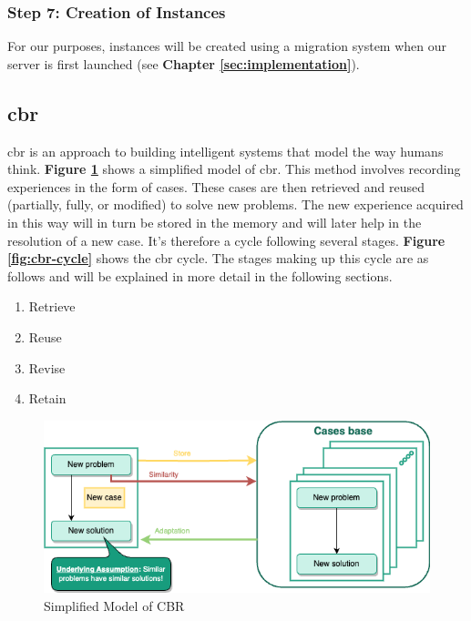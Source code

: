     
    \subsubsection{Step 7: Creation of Instances}
    For our purposes, instances will be created using a migration system when our server is first launched (see \textbf{Chapter \ref{sec:implementation}}).
    

\subsection{\acrlong{cbr} \label{subsec:cbr}}
\acrfull{cbr} is an approach to building intelligent systems that model the way humans think. \textbf{Figure \ref{fig:simple-cbr}} shows a simplified model of \acrshort{cbr}. This method involves recording experiences in the form of cases. These cases are then retrieved and reused (partially, fully, or modified) to solve new problems. The new experience acquired in this way will in turn be stored in the memory and will later help in the resolution of a new case. It's therefore a cycle following several stages. \textbf{Figure \ref{fig:cbr-cycle}} shows the \acrshort{cbr} cycle. The stages making up this cycle are as follows and will be explained in more detail in the following sections.
    
    \begin{enumerate}
        \item Retrieve
        \item Reuse
        \item Revise
        \item Retain
    \end{enumerate}
    
    \begin{figure}[h]
    \centering
    \includegraphics[width=\textwidth]{images/Concept-simplified-cbr-Simplified CBR princip.drawio.png}
    \caption[Simplified Model of CBR]{\label{fig:simple-cbr}  Simplified Model of CBR \cite{probSolCBR}}
    \end{figure}
    

